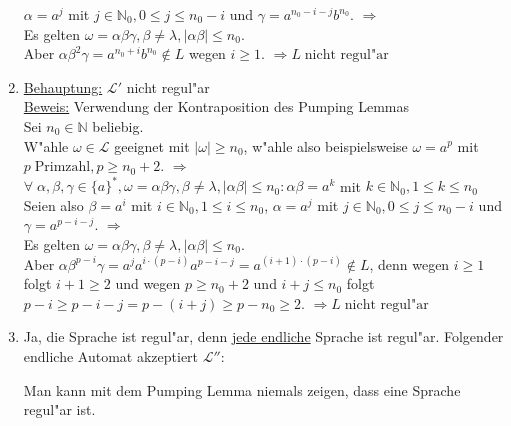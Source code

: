 \documentclass[10pt,oneside,onecolumn,a4paper,german,titlepage]{article}
\begin{document}
\begin{enumerate}
$\alpha = a^j$ mit $j \in \mathbb{N}_0, 0 \leq j \leq n_0-i$ und
$\gamma = a^{n_0-i-j}b^{n_0}$. $\Rightarrow$\\
Es gelten $\omega=\alpha\beta\gamma,\beta \not= \lambda,|\alpha\beta| \leq n_0$.\\
Aber $\alpha\beta^2\gamma = a^{n_0+i}b^{n_0} \notin L$ wegen $i \geq 1$.
$\Rightarrow L \; \mbox{nicht regul"ar}$ 
\item \underline{Behauptung:} $\mathcal{L}'$ nicht regul"ar\\
\underline{Beweis:} Verwendung der Kontraposition des Pumping Lemmas\\
Sei $n_0 \in \mathbb{N}$ beliebig.\\
W"ahle $\omega \in \mathcal{L}$ geeignet mit $|\omega| \geq n_0$, w"ahle also
beispielsweise $\omega = a^p$ mit $p \; \mbox{Primzahl}, p \geq n_0 + 2$.
$\Rightarrow$\\
$\forall \; \alpha,\beta,\gamma \in \{a\}^*, \omega = \alpha\beta\gamma,
\beta \not= \lambda, |\alpha\beta| \leq n_0: \alpha\beta = a^k$ mit
$k \in \mathbb{N}_0, 1 \leq k \leq n_0$\\
Seien also $\beta = a^i$ mit $i \in \mathbb{N}_0, 1 \leq i \leq n_0$,
$\alpha = a^j$ mit $j \in \mathbb{N}_0, 0 \leq j \leq n_0-i$ und
$\gamma = a^{p-i-j}$. $\Rightarrow$\\
Es gelten $\omega=\alpha\beta\gamma,\beta \not= \lambda,|\alpha\beta| \leq n_0$.\\
Aber $\alpha\beta^{p-i}\gamma = a^{j}a^{i\cdot(p-i)}a^{p-i-j} = a^{(i+1)\cdot(p-i)}
\notin L$, denn wegen $i \geq 1$ folgt $i+1 \geq 2$ und wegen $p \geq n_0 + 2$ und
$i+j \leq n_0$ folgt $p-i \geq p-i-j = p-(i+j) \geq p-n_0 \geq 2$.
$\Rightarrow L \; \mbox{nicht regul"ar}$
\item Ja, die Sprache ist regul"ar, denn \underline{jede endliche} Sprache ist
regul"ar. Folgender endliche Automat akzeptiert $\mathcal{L}''$:
\begin{center}
\end{center}
Man kann mit dem Pumping Lemma niemals zeigen, dass eine Sprache regul"ar ist.
\end{enumerate}
\end{document}
